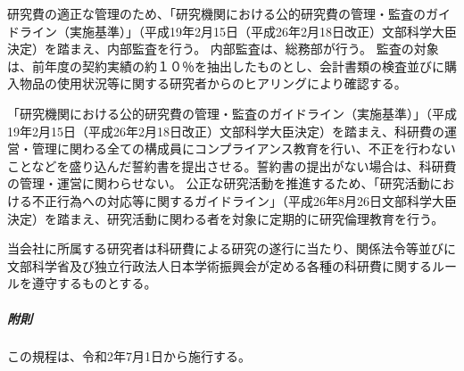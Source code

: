 \documentclass[10pt,a4paper,uplatex]{jsarticle}
\begin{document}
研究費の適正な管理のため、「研究機関における公的研究費の管理・監査のガイドライン（実施基準）」（平成19年2月15日（平成26年2月18日改正）文部科学大臣決定）を踏まえ、内部監査を行う。
\term 内部監査は、総務部が行う。
\term 監査の対象は、前年度の契約実績の約１０％を抽出したものとし、会計書類の検査並びに購入物品の使用状況等に関する研究者からのヒアリングにより確認する。

「研究機関における公的研究費の管理・監査のガイドライン（実施基準）」（平成19年2月15日（平成26年2月18日改正）文部科学大臣決定）を踏まえ、科研費の運営・管理に関わる全ての構成員にコンプライアンス教育を行い、不正を行わないことなどを盛り込んだ誓約書を提出させる。誓約書の提出がない場合は、科研費の管理・運営に関わらせない。
\term 公正な研究活動を推進するため、「研究活動における不正行為への対応等に関するガイドライン」（平成26年8月26日文部科学大臣決定）を踏まえ、研究活動に関わる者を対象に定期的に研究倫理教育を行う。

当会社に所属する研究者は科研費による研究の遂行に当たり、関係法令等並びに文部科学省及び独立行政法人日本学術振興会が定める各種の科研費に関するルールを遵守するものとする。
\\

\subparagraph{附則}
この規程は、令和2年7月1日から施行する。
\end{document}
